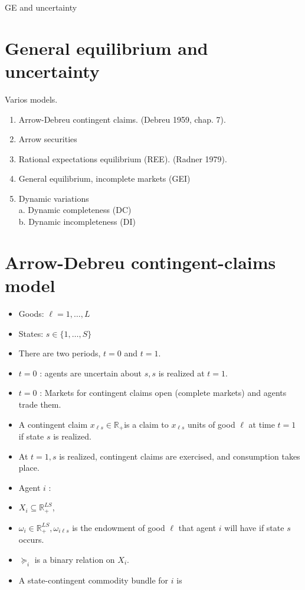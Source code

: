 \documentclass[10pt]{article}
\begin{document}
GE and uncertainty

\section*{General equilibrium and uncertainty}
Varios models.

\begin{enumerate}
  \item Arrow-Debreu contingent claims. (Debreu 1959, chap. 7).
  \item Arrow securities
  \item Rational expectations equilibrium (REE). (Radner 1979).
  \item General equilibrium, incomplete markets (GEI)
  \item Dynamic variations\\
a. Dynamic completeness (DC)\\
b. Dynamic incompleteness (DI)
\end{enumerate}

\section*{Arrow-Debreu contingent-claims model}
\begin{itemize}
  \item Goods: $\ell=1, \ldots, L$
  \item States: $s \in\{1, \ldots, S\}$
  \item There are two periods, $t=0$ and $t=1$.
  \item $t=0$ : agents are uncertain about $s, s$ is realized at $t=1$.
  \item $t=0$ : Markets for contingent claims open (complete markets) and agents trade them.
  \item A contingent claim $x_{\ell s} \in \mathbb{R}_{+}$is a claim to $x_{\ell s}$ units of good $\ell$ at time $t =1$ if state $s$ is realized.
  \item At $t=1, s$ is realized, contingent claims are exercised, and consumption takes place.
  \item Agent $i$ :
  \item $X_{i} \subseteq \mathbb{R}_{+}^{L S}$,
  \item $\omega_{i} \in \mathbb{R}_{+}^{L S}, \omega_{i \ell s}$ is the endowment of good $\ell$ that agent $i$ will have if state $s$ occurs.
  \item $\succeq_{i}$ is a binary relation on $X_{i}$.
  \item A state-contingent commodity bundle for $i$ is
\end{itemize}
\end{document}
